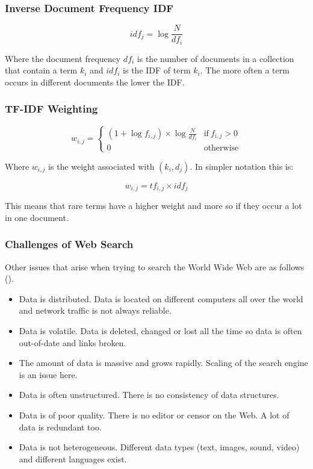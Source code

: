 \subsubsection*{Inverse Document Frequency IDF}

\begin{equation}
  idf_j = \log \frac{N}{df_i}
\end{equation}

Where the document frequency $df_i$ is the number of documents in a collection that contain a term $k_i$ and $idf_i$ is the IDF of term $k_i$. The more often a term occurs in different documents the lower the IDF.

\subsubsection*{TF-IDF Weighting}

\begin{equation}
  w_{i,j} =
  \begin{cases}
  (1+\log f_{i,j})\times \log\frac{N}{df_i} & \text{if} \ f_{i,j} > 0 \\
  0 & \text{otherwise}
  \end{cases}
\end{equation}

Where $w_{i,j}$ is the weight associated with $(k_i,d_j)$. In simpler notation this is:

\begin{equation}
  w_{i,j} = tf_{i,j}\times idf_j
\end{equation}

This means that rare terms have a higher weight and more so if they occur a lot in one document.

\subsubsection*{Challenges of Web Search}

Other issues that arise when trying to search the World Wide Web are as follows (\citep[p.449]{Baeza-Yates2011}).

\begin{itemize}
  \item Data is distributed. Data is located on different computers all over the world and network traffic is not always reliable.
  \item Data is volatile. Data is deleted, changed or lost all the time so data is often out-of-date and links broken.
  \item The amount of data is massive and grows rapidly. Scaling of the search engine is an issue here.
  \item Data is often unstructured. There is no consistency of data structures.
  \item Data is of poor quality. There is no editor or censor on the Web. A lot of data is redundant too.
  \item Data is not heterogeneous. Different data types (text, images, sound, video) and different languages exist.
\end{itemize}

